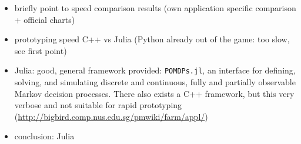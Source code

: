 \begin{itemize}
  \item briefly point to speed comparison results (own application specific comparison + official charts)
  \item prototyping speed C++ vs Julia (Python already out of the game: too slow, see first point)
  \item Julia: good, general framework provided: \texttt{POMDPs.jl}, an interface for
  defining, solving, and simulating discrete and continuous, fully and
  partially observable Markov decision processes.  \cite{egorov2017pomdps}
  There also exists a C++ framework, but this very verbose and not suitable for
  rapid prototyping (\url{http://bigbird.comp.nus.edu.sg/pmwiki/farm/appl/})
  \item conclusion: Julia \cite{bezanson2017julia}
\end{itemize}
